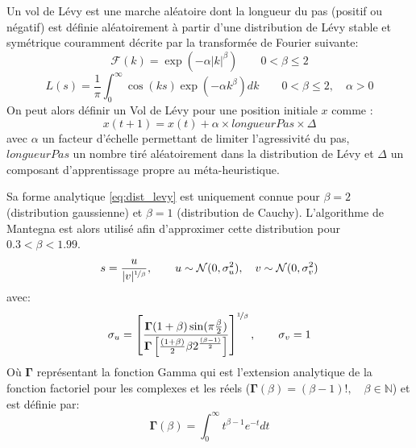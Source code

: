 \begin{Def}\label{def:vol_levy}
Un vol de Lévy est une marche aléatoire dont la longueur du pas (positif ou négatif)
est définie aléatoirement à partir d’une distribution de Lévy stable et symétrique
couramment décrite par la transformée de Fourier suivante:
\begin{equation}\label{eq:fourier_levy}
    \mathcal{F}(k) = \exp(-\alpha\mathopen{|}k\mathclose{|}^{\beta}) \qquad  0 < \beta \leq 2
\end{equation}
\begin{equation}\label{eq:dist_levy}
    L(s) = \frac{1}{\pi} \int_{0}^{\infty} \cos(k s)\exp(-\alpha k^{\beta}) dk \qquad  0 < \beta \leq 2,
           \quad \alpha > 0
\end{equation}
On peut alors définir un Vol de Lévy pour une position initiale $x$ comme :
\begin{equation}
  x(t + 1) = x(t) + \alpha \times longueurPas \times \Delta
\end{equation}
avec $\alpha$ un facteur d’échelle permettant de limiter l’agressivité du pas,
$longueurPas$ un nombre tiré aléatoirement dans la distribution de Lévy et $\Delta$
un composant d’apprentissage propre au méta-heuristique.
\end{Def}

Sa forme analytique \eqref{eq:dist_levy} est uniquement connue pour $\beta = 2$ (distribution gaussienne)
et $\beta = 1$ (distribution de Cauchy).
L’algorithme de Mantegna \parencite{Mantegna19944677} est alors utilisé afin d’approximer cette distribution
pour $0.3 < \beta < 1.99$.
\begin{equation}\label{eq:step_len}
    s = \frac{u}{\mathopen{|}v\mathclose{|}^{\nicefrac{1}{\beta}}}, \qquad u \sim \mathcal{N}(0, \sigma_{u}^{2}),
        \quad v \sim \mathcal{N}(0, \sigma_{v}^{2})
\end{equation}
avec:
\begin{equation}\label{eq:sigmas}
    \sigma_{u} = \left[ \frac{\mathbf{\Gamma}(1+\beta)\sin(\pi\frac{\beta}{2})}%
                             {\mathbf{\Gamma} \left[\frac{(1+\beta)}{2}\beta 2^{\frac{(\beta-1)}{2}}\right]}\right]^{\nicefrac{1}{\beta}},%
    \qquad \sigma_{v} = 1
\end{equation}
Où $\mathbf{\Gamma}$ représentant la fonction Gamma qui est l’extension analytique de la fonction factoriel pour
les complexes et les réels ($\mathbf{\Gamma}(\beta) = (\beta -1)!, \quad \beta\in \mathbb{N}$) et est définie par:
\begin{equation}
    \mathbf{\Gamma}(\beta) = \int_{0}^{\infty} t^{\beta-1}e^{-t} dt
\end{equation}

